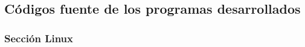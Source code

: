 \documentclass[12pt]{article}
\begin{document}
\newpage

        \subsection{Códigos fuente de los programas desarrollados}
        \subsubsection{Sección Linux}
\end{document}
